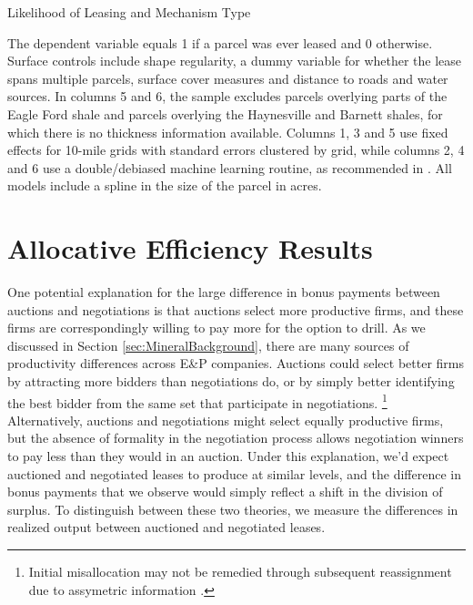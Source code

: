 \documentclass[12pt]{article}
\begin{document}
\addtolength{\tabcolsep}{3pt}
\begin{table}[!htbp]
	\begin{center}
	\begin{threeparttable}
		\caption{Likelihood of Leasing and Mechanism Type}
		\label{tab:tableParcelLeases}
		\small
		            
		\begin{tablenotes}
		\footnotesize
		\item The dependent variable equals 1 if a parcel was ever leased and 0 otherwise.  Surface controls include shape regularity, a dummy variable for whether the lease spans multiple parcels, surface cover measures and distance to roads and water sources.  In columns 5 and 6, the sample excludes parcels overlying parts of the Eagle Ford shale and parcels overlying the Haynesville and Barnett shales, for which there is no thickness information available.  Columns 1, 3 and 5 use fixed effects for 10-mile grids with standard errors clustered by grid, while columns 2, 4 and 6 use a double/debiased machine learning routine, as recommended in \cite{chernozhukov2018double}. All models include a spline in the size of the parcel in acres.
		\end{tablenotes}
	\end{threeparttable}
	\end{center}
\end{table}
\addtolength{\tabcolsep}{-3pt}

\section{Allocative Efficiency Results \label{sec:ResultsProductivity}}
One potential explanation for the large difference in bonus payments between auctions and negotiations is that auctions select more productive firms, and these firms are correspondingly willing to pay more for the option to drill. As we discussed in Section \ref{sec:MineralBackground}, there are many sources of productivity differences across E\&P companies. Auctions could select better firms by attracting more bidders than negotiations do, or by simply better identifying the best bidder from the same set that participate in negotiations. \footnote{Initial misallocation may not be remedied through subsequent reassignment due to assymetric information \citep{BrehmLewis}.} Alternatively, auctions and negotiations might select equally productive firms, but the absence of formality in the negotiation process allows negotiation winners to pay less than they would in an auction.  Under this explanation, we'd expect auctioned and negotiated leases to produce at similar levels, and the difference in bonus payments that we observe would simply reflect a shift in the division of surplus.  To distinguish between these two theories, we measure the differences in realized output between auctioned and negotiated leases. 
\end{document}
